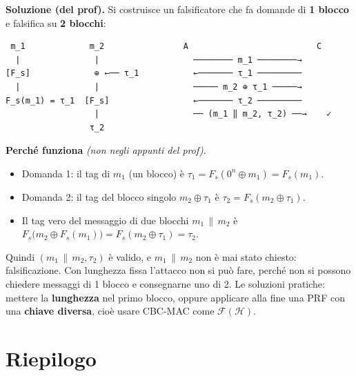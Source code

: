 \textbf{Soluzione (del prof).} Si costruisce un falsificatore che fa domande di \textbf{1 blocco} e falsifica su \textbf{2 blocchi}:

\begin{verbatim}
 m_1             m_2                A                          C
  |               |                   ──────── m_1 ────────→
[F_s]             ⊕ ←── τ_1           ←─────── τ_1 ─────────
  |               |                   ───── m_2 ⊕ τ_1 ─────→
F_s(m_1) = τ_1  [F_s]                 ←─────── τ_2 ─────────
                  |                   ── (m_1 ‖ m_2, τ_2) ──→    ✓
                 τ_2
\end{verbatim}

\begin{nota}
\textbf{Perché funziona} \emph{(non negli appunti del prof)}.
\begin{itemize}
  \item Domanda 1: il tag di \(m_1\) (un blocco) è \(\tau_1 = F_s(0^n \oplus m_1) = F_s(m_1)\).
  \item Domanda 2: il tag del blocco singolo \(m_2 \oplus \tau_1\) è \(\tau_2 = F_s(m_2 \oplus \tau_1)\).
  \item Il tag vero del messaggio di due blocchi \(m_1 \,\|\, m_2\) è \(F_s\big(m_2 \oplus F_s(m_1)\big) = F_s(m_2 \oplus \tau_1) = \tau_2\).
\end{itemize}
Quindi \((m_1 \,\|\, m_2, \tau_2)\) è valido, e \(m_1 \,\|\, m_2\) non è mai stato chiesto: falsificazione. Con lunghezza fissa l'attacco non si può fare, perché non si possono chiedere messaggi di 1 blocco e consegnarne uno di 2. Le soluzioni pratiche: mettere la \textbf{lunghezza} nel primo blocco, oppure applicare alla fine una PRF con una \textbf{chiave diversa}, cioè usare CBC-MAC come \(\mathcal{F}(\mathcal{H})\).
\end{nota}

\section{Riepilogo}

